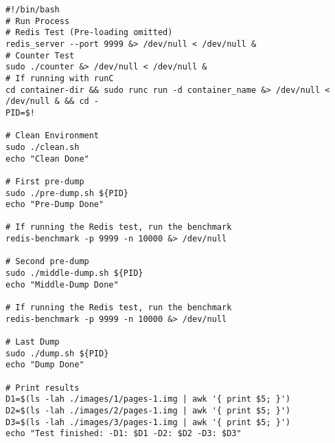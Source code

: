 \begin{lstlisting}[style=Bash,caption={Full evaluation script for the iterative migration micro-benchmark.\label{code:microbenchmark-iterative-evaluation}}]
#!/bin/bash
# Run Process
# Redis Test (Pre-loading omitted)
redis_server --port 9999 &> /dev/null < /dev/null &
# Counter Test
sudo ./counter &> /dev/null < /dev/null &
# If running with runC
cd container-dir && sudo runc run -d container_name &> /dev/null < /dev/null & && cd -
PID=$!

# Clean Environment
sudo ./clean.sh
echo "Clean Done"

# First pre-dump
sudo ./pre-dump.sh ${PID}
echo "Pre-Dump Done"

# If running the Redis test, run the benchmark
redis-benchmark -p 9999 -n 10000 &> /dev/null

# Second pre-dump
sudo ./middle-dump.sh ${PID}
echo "Middle-Dump Done"

# If running the Redis test, run the benchmark
redis-benchmark -p 9999 -n 10000 &> /dev/null

# Last Dump
sudo ./dump.sh ${PID}
echo "Dump Done"

# Print results
D1=$(ls -lah ./images/1/pages-1.img | awk '{ print $5; }')
D2=$(ls -lah ./images/2/pages-1.img | awk '{ print $5; }')
D3=$(ls -lah ./images/3/pages-1.img | awk '{ print $5; }')
echo "Test finished: -D1: $D1 -D2: $D2 -D3: $D3"
\end{lstlisting}
